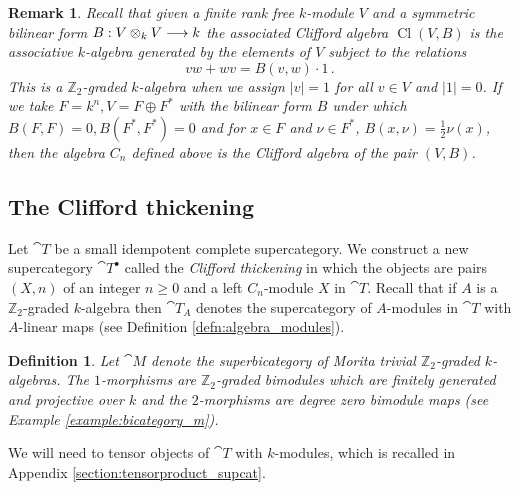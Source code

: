 \documentclass[english,letter paper,12pt,leqno]{article}
\theoremstyle{example}
\newtheorem{definition}[theorem]{Definition}
\newtheorem{remark}[theorem]{Remark}
\numberwithin{equation}{section}
\begin{document}
\begin{remark} Recall that given a finite rank free $k$-module $V$ and a symmetric bilinear form $B: V \otimes_k V \longrightarrow k$ the associated Clifford algebra $\operatorname{Cl}(V, B)$ is the associative $k$-algebra generated by the elements of $V$ subject to the relations
\[
vw + wv = B(v,w) \cdot 1\,.
\]
This is a $\mathbb{Z}_2$-graded $k$-algebra when we assign $|v| = 1$ for all $v \in V$ and $|1| = 0$. If we take $F = k^n, V = F \oplus F^*$ with the bilinear form $B$ under which $B(F,F) = 0, B(F^*, F^*) = 0$ and for $x \in F$ and $\nu \in F^*$, $B(x, \nu) = \frac{1}{2} \nu(x)$, then the algebra $C_n$ defined above is the Clifford algebra of the pair $(V,B)$.
\end{remark}

\subsection{The Clifford thickening}\label{section:cliff_thick}

Let $\cat{T}$ be a small idempotent complete supercategory. We construct a new supercategory $\cat{T}^\bullet$ called the \emph{Clifford thickening} in which the objects are pairs $(X,n)$ of an integer $n \ge 0$ and a left $C_n$-module $X$ in $\cat{T}$. Recall that if $A$ is a $\mathbb{Z}_2$-graded $k$-algebra then $\cat{T}_A$ denotes the supercategory of $A$-modules in $\cat{T}$ with $A$-linear maps (see Definition \ref{defn:algebra_modules}).


\begin{definition} Let $\cat{M}$ denote the superbicategory of Morita trivial $\mathbb{Z}_2$-graded $k$-algebras. The $1$-morphisms are $\mathbb{Z}_2$-graded bimodules which are finitely generated and projective over $k$ and the $2$-morphisms are degree zero bimodule maps (see Example \ref{example:bicategory_m}).
\end{definition}

We will need to tensor objects of $\cat{T}$ with $k$-modules, which is recalled in Appendix \ref{section:tensorproduct_supcat}. 
\end{document}
